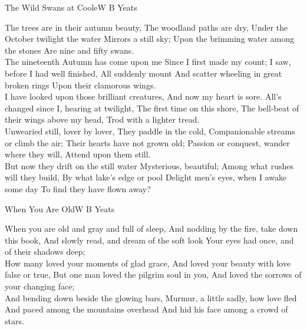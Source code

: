  
\begin{poem}{The Wild Swans at Coole}{W B Yeats}

The trees are in their autumn beauty, 
The woodland paths are dry, 
Under the October twilight the water 
Mirrors a still sky; 
Upon the brimming water among the stones 
Are nine and fifty swans. \\

The nineteenth Autumn has come upon me 
Since I first made my count; 
I saw, before I had well finished, 
All suddenly mount 
And scatter wheeling in great broken rings 
Upon their clamorous wings. \\

I have looked upon those brilliant creatures, 
And now my heart is sore. 
All's changed since I, hearing at twilight, 
The first time on this shore, 
The bell-beat of their wings above my head, 
Trod with a lighter tread. \\

Unwearied still, lover by lover, 
They paddle in the cold, 
Companionable streams or climb the air; 
Their hearts have not grown old; 
Passion or conquest, wander where they will, 
Attend upon them still. \\

But now they drift on the still water 
Mysterious, beautiful; 
Among what rushes will they build, 
By what lake's edge or pool 
Delight men's eyes, when I awake some day 
To find they have flown away?\\
\end{poem}

 

\begin{poem}{When You Are Old}{W B Yeats}

When you are old and gray and full of sleep, 
And nodding by the fire, take down this book, 
And slowly read, and dream of the soft look 
Your eyes had once, and of their shadows deep; \\

How many loved your moments of glad grace, 
And loved your beauty with love false or true, 
But one man loved the pilgrim soul in you, 
And loved the sorrows of your changing face; \\

And bending down beside the glowing bars, 
Murmur, a little sadly, how love fled 
And paced among the mountains overhead 
And hid his face among a crowd of stars. \\
\end{poem}

